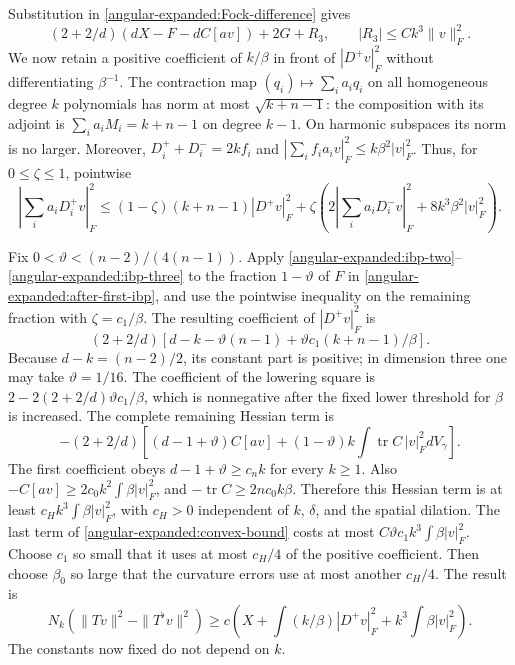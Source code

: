 \documentclass[11pt]{article}
\theoremstyle{definition}
\theoremstyle{remark}
\numberwithin{equation}{section}
\begin{document}
Substitution in \eqref{angular-expanded:Fock-difference} gives
\begin{equation}\label{angular-expanded:after-first-ibp}
 (2+2/d)(dX-F-dC[av])+2G+R_3,
 \qquad |R_3|\leq Ck^3\|v\|_F^2.
\end{equation}
We now retain a positive coefficient of $k/\beta$ in front of
$|D^+v|_F^2$ without differentiating $\beta^{-1}$.
The contraction map $(q_i)\mapsto\sum_i a_iq_i$ on all homogeneous
degree $k$ polynomials has norm at most $\sqrt{k+n-1}$: the composition
with its adjoint is $\sum_i a_iM_i=k+n-1$ on degree $k-1$.
On harmonic subspaces its norm is no larger.  Moreover,
$D_i^++D_i^-=2kf_i$ and
$|\sum_i f_i a_iv|_F^2\leq k\beta^2|v|_F^2$.
Thus, for $0\leq\zeta\leq1$, pointwise
\begin{equation}\label{angular-expanded:convex-bound}
 \left|\sum_i a_iD_i^+v\right|_F^2
 \leq(1-\zeta)(k+n-1)|D^+v|_F^2+
 \zeta\left(2\left|\sum_i a_iD_i^-v\right|_F^2
                         +8k^3\beta^2|v|_F^2\right).
\end{equation}

Fix $0<\vartheta<(n-2)/(4(n-1))$.  Apply
\eqref{angular-expanded:ibp-two}--\eqref{angular-expanded:ibp-three} to the fraction
$1-\vartheta$ of $F$ in \eqref{angular-expanded:after-first-ibp}, and use the
pointwise inequality on the remaining fraction with $\zeta=c_1/\beta$.
The resulting coefficient of $|D^+v|_F^2$ is
\begin{equation}\label{angular-expanded:positive-degree-factor}
 (2+2/d)\left[d-k-\vartheta(n-1)
                       +\vartheta c_1(k+n-1)/\beta\right].
\end{equation}
Because $d-k=(n-2)/2$, its constant part is positive; in dimension three
one may take $\vartheta=1/16$.  The coefficient of the lowering square
is $2-2(2+2/d)\vartheta c_1/\beta$, which is nonnegative after the fixed
lower threshold for $\beta$ is increased.
The complete remaining Hessian term is
\begin{equation}\label{angular-expanded:hessian-contribution}
 -(2+2/d)\left[(d-1+\vartheta)C[av]
 +(1-\vartheta)k\int\operatorname{tr}C\,|v|_F^2dV_\gamma\right].
\end{equation}
The first coefficient obeys $d-1+\vartheta\geq c_nk$ for every $k\geq1$.
Also $-C[av]\geq2c_0k^2\int\beta|v|_F^2$, and
$-\operatorname{tr}C\geq2nc_0k\beta$.  Therefore this Hessian term is
at least $c_Hk^3\int\beta|v|_F^2$, with $c_H>0$ independent of $k$,
$\delta$, and the spatial dilation.
The last term of \eqref{angular-expanded:convex-bound} costs at most
$C\vartheta c_1k^3\int\beta|v|_F^2$.  Choose $c_1$ so small that it
uses at most $c_H/4$ of the positive coefficient.  Then choose $\beta_0$
so large that the curvature errors use at most another $c_H/4$.
The result is
\[
 N_k(\|Tv\|^2-\|T^\flat v\|^2)
 \geq c\left(X+\int(k/\beta)|D^+v|_F^2+
                         k^3\int\beta|v|_F^2\right).
\]
The constants now fixed do not depend on $k$.
\end{document}
